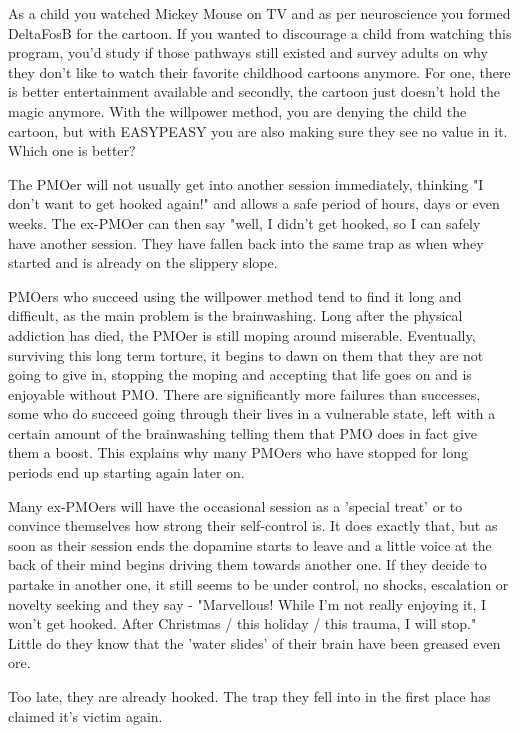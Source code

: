 \documentclass[easypeasy.tex]{subfiles}
\begin{document}
As a child you watched Mickey Mouse on TV and as per neuroscience you formed DeltaFosB for the cartoon. If you wanted to discourage a child from watching this program, you'd study if those pathways still existed and survey adults on why they don't like to watch their favorite childhood cartoons anymore. For one, there is better entertainment available and secondly, the cartoon just doesn't hold the magic anymore. With the willpower method, you are denying the child the cartoon, but with EASYPEASY you are also making sure they see no value in it. Which one is better?

The PMOer will not usually get into another session immediately, thinking "I don't want to get hooked again!" and allows a safe period of hours, days or even weeks. The ex-PMOer can then say "well, I didn't get hooked, so I can safely have another session. They have fallen back into the same trap as when whey started and is already on the slippery slope.

PMOers who succeed using the willpower method tend to find it long and difficult, as the main problem is the brainwashing. Long after the physical addiction has died, the PMOer is still moping around miserable. Eventually, surviving this long term torture, it begins to dawn on them that they are not going to give in, stopping the moping and accepting that life goes on and is enjoyable without PMO. There are significantly more failures than successes, some who do succeed going through their lives in a vulnerable state, left with a certain amount of the brainwashing telling them that PMO does in fact give them a boost. This explains why many PMOers who have stopped for long periods end up starting again later on.

Many ex-PMOers will have the occasional session as a 'special treat' or to convince themselves how strong their self-control is. It does exactly that, but as soon as their session ends the dopamine starts to leave and a little voice at the back of their mind begins driving them towards another one. If they decide to partake in another one, it still seems to be under control, no shocks, escalation or novelty seeking and they say - "Marvellous! While I'm not really enjoying it, I won't get hooked. After Christmas / this holiday / this trauma, I will stop." Little do they know that the 'water slides' of their brain have been greased even ore.

Too late, they are already hooked. The trap they fell into in the first place has claimed it's victim again.
\end{document}
